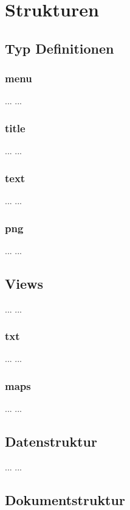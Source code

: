 \chapter{Strukturen}


\section{Typ Definitionen}
\subsection{menu}
...
...

\subsection{title}
...
...

\subsection{text}
...
...

\subsection{png}
...
...



\section{Views}
...
...

\subsection{txt}
...
...

\subsection{maps}
...
...


\section{Datenstruktur}
...
...


\section{Dokumentstruktur}
